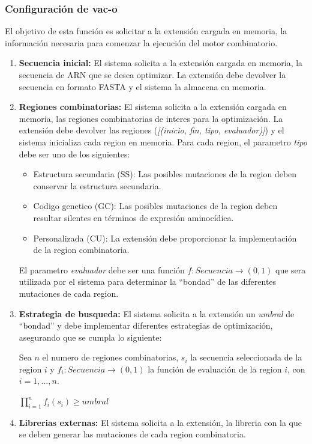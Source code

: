 \documentclass[10pt,a4paper]{article}
\begin{document}
  \subsubsection{Configuraci\'on de vac-o}
  El objetivo de esta funci\'on es solicitar a la extensi\'on cargada en memoria, la informaci\'on necesaria para comenzar la ejecuci\'on del motor combinatorio.
  \begin{enumerate}
    \item \textbf{Secuencia inicial:}
    El sistema solicita a la extensi\'on cargada en memoria, la secuencia de ARN que se desea optimizar. La extensi\'on debe devolver la secuencia en formato FASTA y el sistema la almacena en memoria.
    
    \item \textbf{Regiones combinatorias:}
    El sistema solicita a la extensi\'on cargada en memoria, las regiones combinatorias de interes para la optimizaci\'on. La extensi\'on debe devolver las regiones (\textit{[(inicio, fin, tipo, evaluador)]}) y el sistema inicializa cada region en memoria. Para cada region, el parametro \textit{tipo} debe ser uno de los siguientes:
    \begin{itemize}
      \item Estructura secundaria (SS): Las posibles mutaciones de la region deben conservar la estructura secundaria.
      \item Codigo genetico (GC): Las posibles mutaciones de la region deben resultar silentes en t\'erminos de expresi\'on aminoc\'idica.
      \item Personalizada (CU): La extensi\'on debe proporcionar la implementaci\'on de la region combinatoria.
    \end{itemize}

    El parametro \textit{evaluador} debe ser una funci\'on $f: Secuencia \rightarrow (0,1)$ que sera utilizada por el sistema para determinar la ``bondad'' de las diferentes mutaciones de cada region.

    \item \textbf{Estrategia de busqueda:}
    El sistema solicita a la extensi\'on un \textit{umbral} de ``bondad'' y debe implementar diferentes estrategias de optimizaci\'on, asegurando que se cumpla lo siguiente:

    Sea $n$ el numero de regiones combinatorias, $s_{i}$ la secuencia seleccionada de la region $i$ y $f_{i}: Secuencia \rightarrow (0,1)$ la funci\'on de evaluaci\'on de la region $i$, con $i=1, ..., n$.
    \begin{center}
    $\prod_{i=1}^{n} f_{i}(s_{i}) \ge umbral$
    \end{center}
    \item \textbf{Librerias externas:}
    El sistema solicita a la extensi\'on, la libreria con la que se deben generar las mutaciones de cada region combinatoria.
  \end{enumerate}
\end{document}
